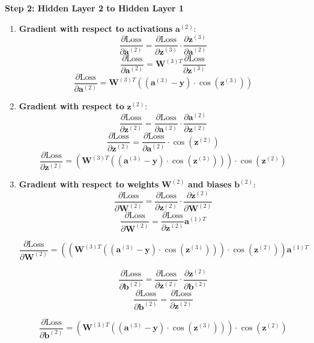 \documentclass{ioereport}
\begin{document}
\textbf{Step 2: Hidden Layer 2 to Hidden Layer 1}
\begin{enumerate}[label=\textbf{\roman*.}]
  \item \textbf{Gradient with respect to activations} $\mathbf{a}^{(2)}$:
    \[
  \frac{\partial \text{Loss}}{\partial \mathbf{a}^{(2)}} = \frac{\partial \text{Loss}}{\partial \mathbf{z}^{(3)}} \cdot \frac{\partial \mathbf{z}^{(3)}}{\partial \mathbf{a}^{(2)}}
  \]
  \[
  \frac{\partial \text{Loss}}{\partial \mathbf{a}^{(2)}} = \mathbf{W}^{(3)T} \frac{\partial \text{Loss}}{\partial \mathbf{z}^{(3)}}
  \]
  \[
  \frac{\partial \text{Loss}}{\partial \mathbf{a}^{(2)}} = \mathbf{W}^{(3)T} \left((\mathbf{a}^{(3)} - \mathbf{y}) \cdot \cos(\mathbf{z}^{(3)})\right)
  \]

  \item \textbf{Gradient with respect to} $\mathbf{z}^{(2)}$:
    \[
  \frac{\partial \text{Loss}}{\partial \mathbf{z}^{(2)}} = \frac{\partial \text{Loss}}{\partial \mathbf{a}^{(2)}} \cdot \frac{\partial \mathbf{a}^{(2)}}{\partial \mathbf{z}^{(2)}}
  \]
  \[
  \frac{\partial \text{Loss}}{\partial \mathbf{z}^{(2)}} = \frac{\partial \text{Loss}}{\partial \mathbf{a}^{(2)}} \cdot \cos(\mathbf{z}^{(2)})
  \]
  \[
  \frac{\partial \text{Loss}}{\partial \mathbf{z}^{(2)}} = \left(\mathbf{W}^{(3)T} \left((\mathbf{a}^{(3)} - \mathbf{y}) \cdot \cos(\mathbf{z}^{(3)})\right)\right) \cdot \cos(\mathbf{z}^{(2)})
  \]

  \item \textbf{Gradient with respect to weights} $\mathbf{W}^{(2)}$ \textbf{and biases} $\mathbf{b}^{(2)}$:
  \[
  \frac{\partial \text{Loss}}{\partial \mathbf{W}^{(2)}} = \frac{\partial \text{Loss}}{\partial \mathbf{z}^{(2)}} \cdot \frac{\partial \mathbf{z}^{(2)}}{\partial \mathbf{W}^{(2)}}
  \]
  \[
  \frac{\partial \text{Loss}}{\partial \mathbf{W}^{(2)}} = \frac{\partial \text{Loss}}{\partial \mathbf{z}^{(2)}} \mathbf{a}^{(1)T}
  \]

\[
  \frac{\partial \text{Loss}}{\partial \mathbf{W}^{(2)}} = \left(\left(\mathbf{W}^{(3)T} \left((\mathbf{a}^{(3)} - \mathbf{y}) \cdot \cos(\mathbf{z}^{(3)})\right)\right) \cdot \cos(\mathbf{z}^{(2)})\right) \mathbf{a}^{(1)T}
  \]
 

   \[
  \frac{\partial \text{Loss}}{\partial \mathbf{b}^{(2)}} = \frac{\partial \text{Loss}}{\partial \mathbf{z}^{(2)}} \cdot \frac{\partial \mathbf{z}^{(2)}}{\partial \mathbf{b}^{(2)}}
  \]
  \[
  \frac{\partial \text{Loss}}{\partial \mathbf{b}^{(2)}} = \frac{\partial \text{Loss}}{\partial \mathbf{z}^{(2)}}
  \]

   \[
  \frac{\partial \text{Loss}}{\partial \mathbf{b}^{(2)}} = \left(\mathbf{W}^{(3)T} \left((\mathbf{a}^{(3)} - \mathbf{y}) \cdot \cos(\mathbf{z}^{(3)})\right)\right) \cdot \cos(\mathbf{z}^{(2)})
  \]
\end{enumerate}
\end{document}
